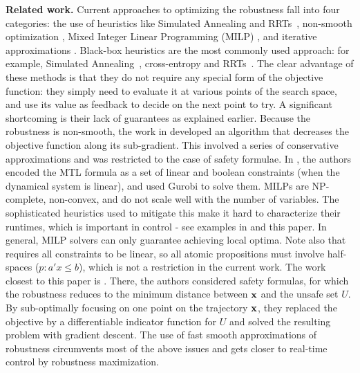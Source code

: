 \textbf{Related work.}
Current approaches to optimizing the robustness fall into four categories: 
the use of heuristics like Simulated Annealing and RRTs~\cite{NghiemSFIGP10hscc,SankaranarayananF2012hscc,Dreossi15_RRTFalsification,Deshmukh15_IterativeApproaches}, 
non-smooth optimization \cite{AbbasF13acc}, 
Mixed Integer Linear Programming (MILP) \cite{Raman14_MPCSTL,Saha_acc16}, 
and iterative approximations \cite{AbbasATVA11_LinFalsification,Abbas14_MTLDescent}.
Black-box heuristics are the most commonly used approach: for example, Simulated Annealing~\cite{NghiemSFIGP10hscc}, cross-entropy \cite{SankaranarayananF2012hscc} and RRTs~\cite{Dreossi15_RRTFalsification}.
The clear advantage of these methods is that they do not require any special form of the objective function: they simply need to evaluate it at various points of the search space, and use its value as feedback to decide on the next point to try.
A significant shortcoming is their lack of guarantees as explained earlier.
Because the robustness is non-smooth, the work in \cite{AbbasF13acc} developed an algorithm that decreases the objective function along its sub-gradient. 
This involved a series of conservative approximations and was restricted to the case of safety formulae.
In \cite{Raman14_MPCSTL}, the authors encoded the MTL formula as a set of linear and boolean constraints (when the dynamical system is linear), and used Gurobi to solve them.
MILPs are NP-complete, non-convex, and do not scale well with the number of variables. 
The sophisticated heuristics used to mitigate this make it hard to characterize their runtimes, which is important in control - see examples in \cite{Raman14_MPCSTL} and this paper. 
In general, MILP solvers can only guarantee achieving local optima.
Note also that \cite{Raman14_MPCSTL} requires all constraints to be linear, so all atomic propositions must involve half-spaces ($p: a'x\leq b$), which is not a restriction in the current work.
The work closest to this paper is \cite{AbbasATVA11_LinFalsification,Abbas14_MTLDescent}.
There, the authors considered safety formulas, for which the robustness reduces to the minimum distance between $\mathbf{x}$ and the unsafe set $U$.
By sub-optimally focusing on one point on the trajectory $\mathbf{x}$, they replaced the objective by a differentiable indicator function for $U$ and solved the resulting problem with gradient descent.
The use of fast smooth approximations of robustness circumvents most of the above issues and gets closer to real-time control by robustness maximization.




